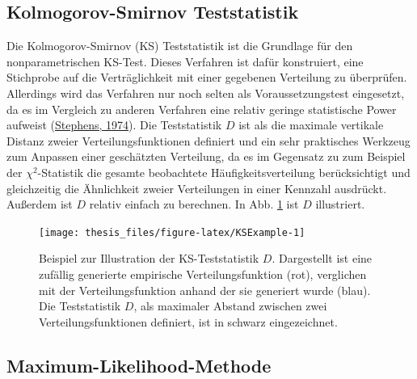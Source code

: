 \documentclass[
  12pt,
  openany]{book}
\begin{document}
\hypertarget{kolmogorov-smirnov-teststatistik}{%
\subsection{Kolmogorov-Smirnov Teststatistik}\label{kolmogorov-smirnov-teststatistik}}

Die Kolmogorov-Smirnov (KS) Teststatistik ist die Grundlage für den nonparametrischen KS-Test. Dieses Verfahren ist dafür konstruiert, eine Stichprobe auf die Verträglichkeit mit einer gegebenen Verteilung zu überprüfen. Allerdings wird das Verfahren nur noch selten als Voraussetzungstest eingesetzt, da es im Vergleich zu anderen Verfahren eine relativ geringe statistische Power aufweist (\protect\hyperlink{ref-stephensEDFStatisticsGoodness1974}{Stephens, 1974}).
Die Teststatistik \(D\) ist als die maximale vertikale Distanz zweier Verteilungsfunktionen definiert und ein sehr praktisches Werkzeug zum Anpassen einer geschätzten Verteilung, da es im Gegensatz zu zum Beispiel der \(\chi^2\)-Statistik die gesamte beobachtete Häufigkeitsverteilung berücksichtigt und gleichzeitig die Ähnlichkeit zweier Verteilungen in einer Kennzahl ausdrückt. Außerdem ist \(D\) relativ einfach zu berechnen. In Abb. \ref{fig:KSExample} ist \(D\) illustriert.





\begin{figure}

{\centering \texttt{[image: thesis\_files/figure-latex/KSExample-1]} 

}

\caption[Beispiel zur Illustration der KS-Teststatistik \(D\).]{Beispiel zur Illustration der KS-Teststatistik \(D\). Dargestellt ist eine zufällig generierte empirische Verteilungsfunktion (rot), verglichen mit der Verteilungsfunktion anhand der sie generiert wurde (blau). Die Teststatistik \(D\), als maximaler Abstand zwischen zwei Verteilungsfunktionen definiert, ist in schwarz eingezeichnet.}\label{fig:KSExample}
\end{figure}

\hypertarget{maximum-likelihood-methode}{%
\subsection{Maximum-Likelihood-Methode}\label{maximum-likelihood-methode}}
\end{document}
